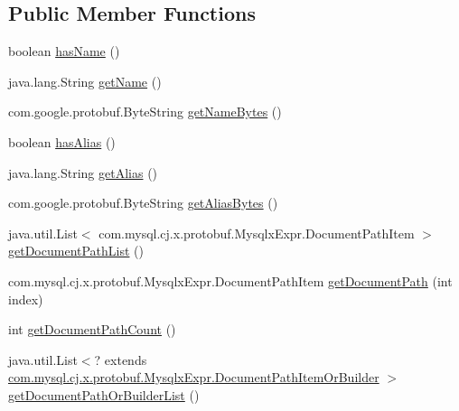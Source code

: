 \subsection*{Public Member Functions}
\begin{DoxyCompactItemize}
\item 
boolean \mbox{\hyperlink{interfacecom_1_1mysql_1_1cj_1_1x_1_1protobuf_1_1_mysqlx_crud_1_1_column_or_builder_aa8143600edda62e2600f685253240a17}{has\+Name}} ()
\item 
java.\+lang.\+String \mbox{\hyperlink{interfacecom_1_1mysql_1_1cj_1_1x_1_1protobuf_1_1_mysqlx_crud_1_1_column_or_builder_a1d1d8ad4a99e4a9632939cee2ddbf8f6}{get\+Name}} ()
\item 
com.\+google.\+protobuf.\+Byte\+String \mbox{\hyperlink{interfacecom_1_1mysql_1_1cj_1_1x_1_1protobuf_1_1_mysqlx_crud_1_1_column_or_builder_ae399f105312164f8bfc002c480456621}{get\+Name\+Bytes}} ()
\item 
boolean \mbox{\hyperlink{interfacecom_1_1mysql_1_1cj_1_1x_1_1protobuf_1_1_mysqlx_crud_1_1_column_or_builder_a2bd7e7f94c1300bbb3ebd953ca701998}{has\+Alias}} ()
\item 
java.\+lang.\+String \mbox{\hyperlink{interfacecom_1_1mysql_1_1cj_1_1x_1_1protobuf_1_1_mysqlx_crud_1_1_column_or_builder_acc9349270b9cf8a4e85c8a68dcbdfed4}{get\+Alias}} ()
\item 
com.\+google.\+protobuf.\+Byte\+String \mbox{\hyperlink{interfacecom_1_1mysql_1_1cj_1_1x_1_1protobuf_1_1_mysqlx_crud_1_1_column_or_builder_a756c13bd36209018c41b20a60032f88c}{get\+Alias\+Bytes}} ()
\item 
java.\+util.\+List$<$ com.\+mysql.\+cj.\+x.\+protobuf.\+Mysqlx\+Expr.\+Document\+Path\+Item $>$ \mbox{\hyperlink{interfacecom_1_1mysql_1_1cj_1_1x_1_1protobuf_1_1_mysqlx_crud_1_1_column_or_builder_a93abadba2cb7c4c3e4df1e1a4449dc1f}{get\+Document\+Path\+List}} ()
\item 
com.\+mysql.\+cj.\+x.\+protobuf.\+Mysqlx\+Expr.\+Document\+Path\+Item \mbox{\hyperlink{interfacecom_1_1mysql_1_1cj_1_1x_1_1protobuf_1_1_mysqlx_crud_1_1_column_or_builder_a1a4f88ab1d143f050a2084c53a9195e3}{get\+Document\+Path}} (int index)
\item 
int \mbox{\hyperlink{interfacecom_1_1mysql_1_1cj_1_1x_1_1protobuf_1_1_mysqlx_crud_1_1_column_or_builder_a39ce634379fa1ef8bf449423b6b150d1}{get\+Document\+Path\+Count}} ()
\item 
java.\+util.\+List$<$? extends \mbox{\hyperlink{interfacecom_1_1mysql_1_1cj_1_1x_1_1protobuf_1_1_mysqlx_expr_1_1_document_path_item_or_builder}{com.\+mysql.\+cj.\+x.\+protobuf.\+Mysqlx\+Expr.\+Document\+Path\+Item\+Or\+Builder}} $>$ \mbox{\hyperlink{interfacecom_1_1mysql_1_1cj_1_1x_1_1protobuf_1_1_mysqlx_crud_1_1_column_or_builder_a657b83a3c5b002d57a2bca6678d3c8ac}{get\+Document\+Path\+Or\+Builder\+List}} ()

\end{DoxyCompactItemize}
